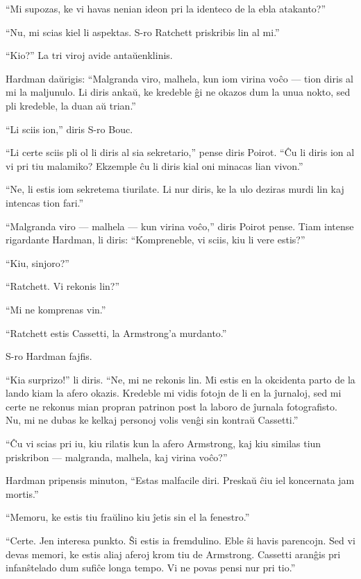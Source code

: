 ``Mi supozas, ke vi havas nenian ideon pri la identeco de la ebla atakanto?''

``Nu, mi scias kiel li aspektas. S-ro Ratchett priskribis lin al mi.''

``Kio?'' La tri viroj avide antaŭenklinis.

Hardman daŭrigis: ``Malgranda viro, malhela, kun iom virina voĉo --- tion diris al mi la maljunulo. Li diris ankaŭ, ke kredeble ĝi ne okazos dum la unua nokto, sed pli kredeble, la duan aŭ trian.''

``Li sciis ion,'' diris S-ro Bouc.

``Li certe sciis pli ol li diris al sia sekretario,'' pense diris Poirot. ``Ĉu li diris ion al vi pri tiu malamiko? Ekzemple ĉu li diris kial oni minacas lian vivon.''

``Ne, li estis iom sekretema tiurilate. Li nur diris, ke la ulo deziras murdi lin kaj intencas tion fari.''

``Malgranda viro --- malhela --- kun virina voĉo,'' diris Poirot pense. Tiam intense rigardante Hardman, li diris: ``Kompreneble, vi sciis, kiu li vere estis?''

``Kiu, sinjoro?''

``Ratchett. Vi rekonis lin?''

``Mi ne komprenas vin.''

``Ratchett estis Cassetti, la Armstrong'a murdanto.''

S-ro Hardman fajfis.

``Kia surprizo!'' li diris. ``Ne, mi ne rekonis lin. Mi estis en la okcidenta parto de la lando kiam la afero okazis. Kredeble mi vidis fotojn de li en la ĵurnaloj, sed mi certe ne rekonus mian propran patrinon post la laboro de ĵurnala fotografisto. Nu, mi ne dubas ke kelkaj personoj volis venĝi sin kontraŭ Cassetti.''

``Ĉu vi scias pri iu, kiu rilatis kun la afero Armstrong, kaj kiu similas tiun priskribon --- malgranda, malhela, kaj virina voĉo?''

Hardman pripensis minuton, ``Estas malfacile diri. Preskaŭ ĉiu iel koncernata jam mortis.''

``Memoru, ke estis tiu fraŭlino kiu ĵetis sin el la fenestro.''

``Certe. Jen interesa punkto. Ŝi estis ia fremdulino. Eble ŝi havis parencojn. Sed vi devas memori, ke estis aliaj aferoj krom tiu de Armstrong. Cassetti aranĝis pri infanŝtelado dum sufiĉe longa tempo. Vi ne povas pensi nur pri tio.''

